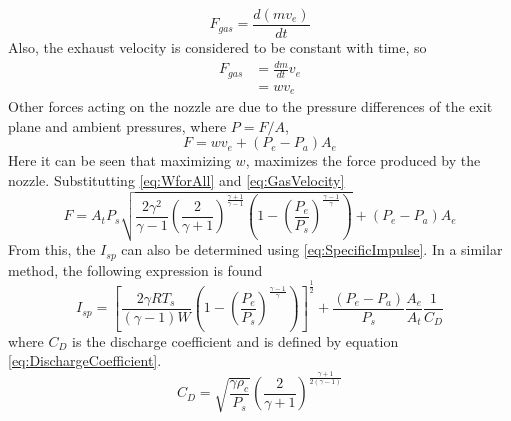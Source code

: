 \begin{equation}
F_{gas}=\frac{d(mv_e)}{dt}
\end{equation}
Also, the exhaust velocity is considered to be constant with time, so
\begin{align}
F_{gas}&=\frac{dm}{dt}v_e\\
&=wv_e
\end{align}
Other forces acting on the nozzle are due to the pressure differences of the exit plane and ambient pressures, where $P=F/A$,
\begin{equation}
F=wv_e + (P_e-P_a)A_e
\end{equation}
Here it can be seen that maximizing $w$, maximizes the force produced by the nozzle. Substitutting \ref{eq:WforAll} and \ref{eq:GasVelocity}
\begin{equation}\label{eq:TheoreticalForce}
F= A_tP_s\sqrt{\frac{2\gamma^2}{\gamma-1}\left(\frac{2}{\gamma+1}\right)^{\frac{\gamma+1}{\gamma-1}}\left(1-\left(\frac{P_e}{P_s}\right)^{\frac{\gamma-1}{\gamma}}\right)}+\left(P_e-P_a\right)A_e
\end{equation}
From this, the $I_{sp}$ can also be determined using \ref{eq:SpecificImpulse}. In a similar method, the following expression is found
\begin{equation}\label{eq:TheoreticalSpecificImpulse}
I_{sp}=\left[\frac{2\gamma R T_s}{(\gamma-1)W}\left(1-\left(\frac{P_e}{P_s}\right)^{\frac{\gamma-1}{\gamma}}\right)\right]^{\frac{1}{2}}+\frac{(P_e-P_a)}{P_s}\frac{A_e}{A_t}\frac{1}{C_D}
\end{equation}
where $C_D$ is the discharge coefficient and is defined by equation \ref{eq:DischargeCoefficient}.
\begin{equation}\label{eq:DischargeCoefficient}
C_D=\sqrt{\frac{\gamma \rho_c}{P_s}}\left(\frac{2}{\gamma+1}\right)^{\frac{\gamma+1}{2(\gamma-1)}}
\end{equation}%
